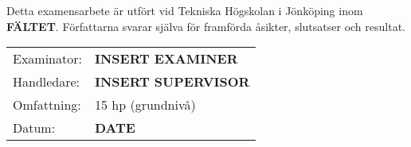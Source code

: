 \documentclass[example.tex]{subfiles}
\begin{document}
    \newpage
    \vspace*{\fill}
    Detta examensarbete är utfört vid Tekniska Högskolan i Jönköping inom \textbf{FÄLTET}. Författarna svarar själva för framförda åsikter, slutsatser och resultat.
    \newline
    \noindent
    \begin{tabular}{l l}
        Examinator:& \textbf{INSERT EXAMINER}\\
        Handledare:& \textbf{INSERT SUPERVISOR}\\
        Omfattning:& 15 hp (grundnivå)\\
        Datum:& \textbf{DATE}
    \end{tabular}
    \newpage
\end{document}
